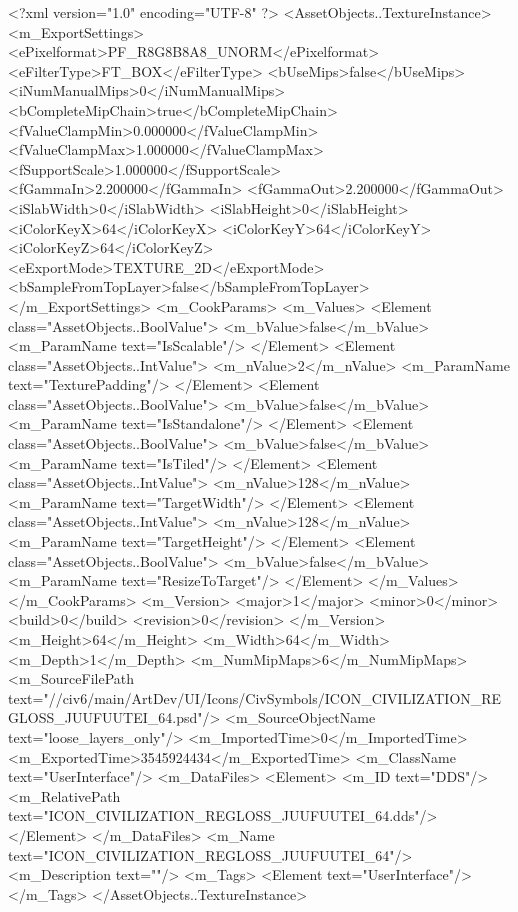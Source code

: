 <?xml version="1.0" encoding="UTF-8" ?>
<AssetObjects..TextureInstance>
	<m_ExportSettings>
		<ePixelformat>PF_R8G8B8A8_UNORM</ePixelformat>
		<eFilterType>FT_BOX</eFilterType>
		<bUseMips>false</bUseMips>
		<iNumManualMips>0</iNumManualMips>
		<bCompleteMipChain>true</bCompleteMipChain>
		<fValueClampMin>0.000000</fValueClampMin>
		<fValueClampMax>1.000000</fValueClampMax>
		<fSupportScale>1.000000</fSupportScale>
		<fGammaIn>2.200000</fGammaIn>
		<fGammaOut>2.200000</fGammaOut>
		<iSlabWidth>0</iSlabWidth>
		<iSlabHeight>0</iSlabHeight>
		<iColorKeyX>64</iColorKeyX>
		<iColorKeyY>64</iColorKeyY>
		<iColorKeyZ>64</iColorKeyZ>
		<eExportMode>TEXTURE_2D</eExportMode>
		<bSampleFromTopLayer>false</bSampleFromTopLayer>
	</m_ExportSettings>
	<m_CookParams>
		<m_Values>
			<Element class="AssetObjects..BoolValue">
				<m_bValue>false</m_bValue>
				<m_ParamName text="IsScalable"/>
			</Element>
			<Element class="AssetObjects..IntValue">
				<m_nValue>2</m_nValue>
				<m_ParamName text="TexturePadding"/>
			</Element>
			<Element class="AssetObjects..BoolValue">
				<m_bValue>false</m_bValue>
				<m_ParamName text="IsStandalone"/>
			</Element>
			<Element class="AssetObjects..BoolValue">
				<m_bValue>false</m_bValue>
				<m_ParamName text="IsTiled"/>
			</Element>
			<Element class="AssetObjects..IntValue">
				<m_nValue>128</m_nValue>
				<m_ParamName text="TargetWidth"/>
			</Element>
			<Element class="AssetObjects..IntValue">
				<m_nValue>128</m_nValue>
				<m_ParamName text="TargetHeight"/>
			</Element>
			<Element class="AssetObjects..BoolValue">
				<m_bValue>false</m_bValue>
				<m_ParamName text="ResizeToTarget"/>
			</Element>
		</m_Values>
	</m_CookParams>
	<m_Version>
		<major>1</major>
		<minor>0</minor>
		<build>0</build>
		<revision>0</revision>
	</m_Version>
	<m_Height>64</m_Height>
	<m_Width>64</m_Width>
	<m_Depth>1</m_Depth>
	<m_NumMipMaps>6</m_NumMipMaps>
	<m_SourceFilePath text="//civ6/main/ArtDev/UI/Icons/CivSymbols/ICON_CIVILIZATION_REGLOSS_JUUFUUTEI_64.psd"/>
	<m_SourceObjectName text="loose_layers_only"/>
	<m_ImportedTime>0</m_ImportedTime>
	<m_ExportedTime>3545924434</m_ExportedTime>
	<m_ClassName text="UserInterface"/>
	<m_DataFiles>
		<Element>
			<m_ID text="DDS"/>
			<m_RelativePath text="ICON_CIVILIZATION_REGLOSS_JUUFUUTEI_64.dds"/>
		</Element>
	</m_DataFiles>
	<m_Name text="ICON_CIVILIZATION_REGLOSS_JUUFUUTEI_64"/>
	<m_Description text=""/>
	<m_Tags>
		<Element text="UserInterface"/>
	</m_Tags>
</AssetObjects..TextureInstance>


